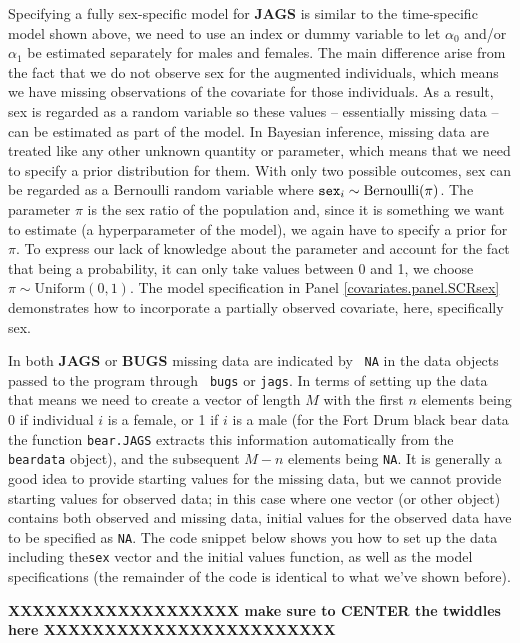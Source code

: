 Specifying a fully sex-specific model for {\bf JAGS} is similar to the
time-specific model shown above, we need to use an index or dummy
variable to let $\alpha_0$ and/or $\alpha_1$ be estimated separately
for males and females. The main difference arise from the fact that we
do not observe sex for the augmented individuals, which means we have
missing observations of the covariate for those individuals. As a
result, sex is regarded as a random variable so these values --
essentially missing data -- can be estimated as part of the model. In
Bayesian inference, missing data are treated like any other unknown
quantity or parameter, 
 which means that we need to specify a prior distribution for them.
 With only two possible outcomes, sex can be
regarded as a Bernoulli random variable where $\mbox{\tt sex}_{i} \sim
\mbox{Bernoulli}(\pi)$.
 The parameter $\pi$ is the sex
ratio of the population and, since it is something we want to estimate
(a hyperparameter of the model), we again have to specify a prior for
$\pi$. To express our lack of knowledge about the parameter and
account for the fact that being a probability, it can only take values
between 0 and 1, we choose $\pi \sim \mbox{Uniform}(0,1)$.  The model
specification in Panel \ref{covariates.panel.SCRsex} demonstrates how
to incorporate a partially observed covariate, here, specifically sex.

In both {\bf JAGS} or {\bf BUGS} missing data are indicated by  {\tt
  NA} in the data objects passed to the program through \mbox{\tt
  bugs} or \mbox{\tt jags}. In terms of setting up the data that means we need to create a
vector of length $M$ with the first $n$ elements being 0 if individual
$i$ is a female, or 1 if $i$ is a male (for the Fort Drum black bear
data the function {\tt bear.JAGS} extracts this information
automatically from the {\tt beardata} object), and the subsequent
$M-n$ elements being {\tt NA}.  It is generally a good idea to provide
starting values for the missing data, but we cannot provide starting
values for observed data; in this case where one vector (or other
object) contains both observed and missing data, initial values for
the observed data have to be specified as {\tt NA}.  The code snippet
below shows you how to set up the data including the{\tt sex} vector
and the initial values function, as well as the {\jags} model
specifications (the remainder of the code is identical to what we've
shown before).

{\bf XXXXXXXXXXXXXXXXXXX make sure to CENTER the twiddles here
  XXXXXXXXXXXXXXXXXXXXXXXX}

